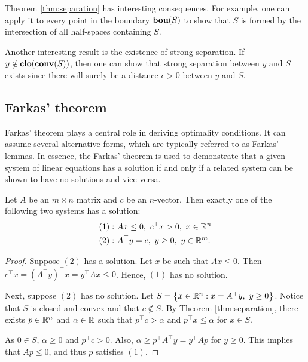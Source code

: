Theorem \ref{thm:separation} has interesting consequences. For example, one can apply it to every point in the boundary $\mathop{\bf bou}(S)$ to show that $S$ is formed by the intersection of all half-spaces containing $S$. 

Another interesting result is the existence of strong separation. If $y \notin \mathop{\bf clo}(\mathop{\bf conv}(S))$, then one can show that strong separation between $y$ and $S$ exists since there will surely be a distance $\epsilon>0$ between $y$ and $S$. 


\subsection{Farkas' theorem}

Farkas' theorem plays a central role in deriving optimality conditions. It can assume several alternative forms, which are typically referred to as Farkas' lemmas. In essence, the Farkas' theorem is used to demonstrate that a given system of linear equations has a solution if and only if a related system can be shown to have no solutions and vice-versa. 

\begin{theorem}
	Let $A$ be an $m \times n$ matrix and $c$ be an $n$-vector. Then exactly one of the following two systems has a solution:
	\begin{align*}
		(1) :~ &Ax \leq 0, \ c^\top x > 0, \ x \in \mathbb{R}^n\\
		(2) :~ &A^\top y = c, \ y \geq 0, \ y \in \mathbb{R}^m.  
	\end{align*}
\end{theorem}

\begin{proof}
	Suppose $(2)$ has a solution. Let $x$ be such that $Ax \leq 0$. Then $c^\top x = (A^\top y)^\top x = y^\top Ax \leq 0$. Hence, $(1)$ has no solution. 
	
	Next, suppose $(2)$ has no solution. Let $S = \left\{ x \in \mathbb{R}^n : x = A^\top y, \ y \geq 0 \right \}$. \hspace{-3pt}Notice that $S$ is closed and convex and that $c \notin S$. By Theorem \ref{thm:separation}, there exists $p \in \mathbb{R}^n$ and $\alpha \in \mathbb{R}$ such that $p^\top c > \alpha$ and $p^\top x \leq \alpha$ for $x \in S$. 
	
	As $0 \in S$, $\alpha \geq 0$ and $p^\top c > 0$. Also, $\alpha \geq p^\top A^\top y = y^\top Ap$ for $y \geq 0$. This implies that $Ap \leq 0$, and thus $p$ satisfies $(1)$. 
\end{proof}

